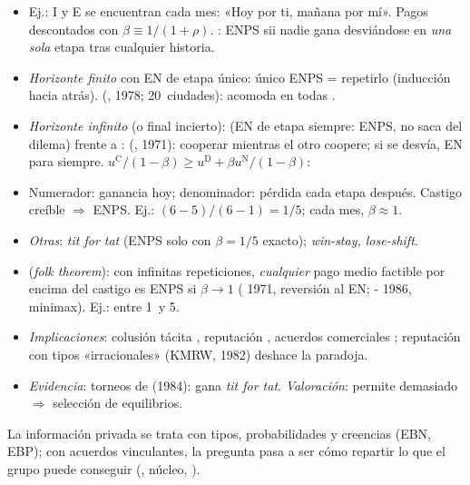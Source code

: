 \documentclass{article}
\begin{document}
\begin{columnas}
\begin{itemize}
\item Ej.: \textup{I} y E se encuentran cada mes: «Hoy por ti, mañana por mí». Pagos descontados con $\beta\equiv1/(1+\rho)$. : ENPS sii nadie gana desviándose en \emph{una sola} etapa tras cualquier historia.
\item \emph{Horizonte finito} con EN de etapa único: único ENPS = repetirlo (inducción hacia atrás).  (, 1978; 20~ciudades): acomoda en todas .
\item \emph{Horizonte infinito} (o final incierto):  (EN de etapa siempre: ENPS, no saca del dilema) frente a :  (, 1971): cooperar mientras el otro coopere; si se desvía, EN para siempre. $u^{\mathrm C}/(1-\beta)\geq u^{\mathrm D}+\beta u^{\mathrm N}/(1-\beta)$:
\item[] Numerador: ganancia hoy; denominador: pérdida cada etapa después. Castigo creíble $\Rightarrow$ ENPS. Ej.: $(6-5)/(6-1)=1/5$; cada mes, $\beta\approx1$.
\item \emph{Otras}: \emph{tit for tat} (ENPS solo con $\beta=1/5$ exacto); \emph{win-stay, lose-shift}.
\item {} (\emph{folk theorem}): con infinitas repeticiones, \emph{cualquier} pago medio factible por encima del castigo es ENPS si $\beta\to1$ ( 1971, reversión al EN; - 1986, minimax). Ej.: entre 1~y 5.
\item \emph{Implicaciones}: colusión tácita , reputación , acuerdos comerciales ; reputación con tipos «irracionales» (KMRW, 1982) deshace la paradoja.
\item \emph{Evidencia}: torneos de  (1984): gana \emph{tit for tat}. \emph{Valoración}: permite demasiado $\Rightarrow$ selección de equilibrios.
\end{itemize}

\begin{ideaclave}
La información privada se trata con tipos, probabilidades y creencias (EBN, EBP); con acuerdos vinculantes, la pregunta pasa a ser cómo repartir lo que el grupo puede conseguir (, núcleo, ).
\end{ideaclave}


\end{columnas}
\end{document}
